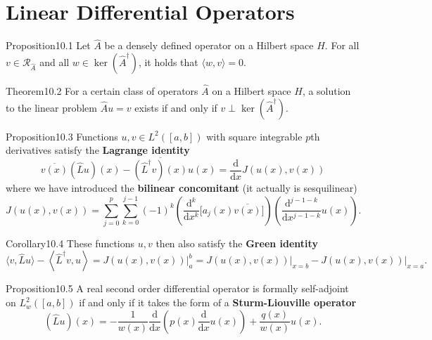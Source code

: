 \section{Linear Differential Operators}

\begin{res}{Proposition}{10.1}
Let $\hat A$ be a densely defined operator on a Hilbert space $H$. For all $v\in\mathcal R_{\hat A}$ and all $w\in\ker(\hat A^\dagger)$, it holds that $\langle w,v\rangle=0$.
\end{res}

\begin{res}{Theorem}{10.2}
For a certain class of operators $\hat A$ on a Hilbert space $H$, a solution to the linear problem $\hat Au=v$ exists if and only if $v\perp\ker(\hat A^\dagger)$.
\end{res}

\begin{res}{Proposition}{10.3}
Functions $u,v\in L^2([a,b])$ with square integrable $p$th derivatives satisfy the \textbf{Lagrange identity}
\begin{equation}\overline{v(x)}(\hat Lu)(x)-\overline{(\hat L^\dagger v)(x)}u(x)=\frac{\mathrm d}{\mathrm dx}J(u(x),v(x))\tag{10.15}\end{equation}
where we have introduced the \textbf{bilinear concomitant} (it actually is sesquilinear)
\begin{equation}J(u(x),v(x))=\sum_{j=0}^p\sum_{k=0}^{j-1}(-1)^k\left(\frac{\mathrm d^k}{\mathrm dx^k}\bigl[a_j(x)\overline{v(x)}\bigr]\right)\left(\frac{\mathrm d^{j-1-k}}{\mathrm dx^{j-1-k}}u(x)\right).\tag{10.16}\end{equation}
\end{res}

\begin{res}{Corollary}{10.4}
These functions $u,v$ then also satisfy the \textbf{Green identity}
\begin{equation}\langle v,\hat Lu\rangle-\left\langle\hat L^\dagger v,u\right\rangle=J(u(x),v(x))\Big|_a^b=J(u(x),v(x))\Big|_{x=b}-J(u(x),v(x))\Big|_{x=a}.\tag{10.17}\end{equation}
\end{res}

\begin{res}{Proposition}{10.5}
A real second order differential operator is formally self-adjoint on $L^2_w([a,b])$ if and only if it takes the form of a \textbf{Sturm-Liouville operator}
\begin{equation}(\hat Lu)(x)=-\frac1{w(x)}\frac{\mathrm d}{\mathrm dx}\left(p(x)\frac{\mathrm d}{\mathrm dx}u(x)\right)+\frac{q(x)}{w(x)}u(x).\tag{10.26}\end{equation}
\end{res}

